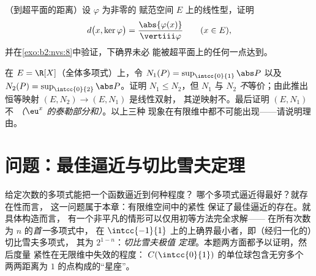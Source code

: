 \begin{exercise}[$\star\star$]\label{exo:b2:nvs:11}
（到超平面的距离）设 $\varphi$ 为非零的
赋范空间 $E$ 上的线性型，证明
\[
d\bigl(x, \ker\varphi\bigr) =
\frac{\abs{\varphi(x)}}{\vertiii\varphi}
\qquad (x \in E),
\]
并在\cref{exo:b2:nvs:8}中验证，下确界未必
能被超平面上的任何一点达到。
\end{exercise}

\begin{exercise}[$\star\star\star$]\label{exo:b2:nvs:12}
在 $E = \R[X]$（全体多项式）上，令 $N_1(P) =
\sup_{\intcc{0}{1}}\abs P$ 以及 $N_2(P) =
\sup_{\intcc{0}{2}}\abs P$。证明 $N_1 \leq N_2$，但
$N_1$ 与 $N_2$ \emph{不}等价；由此推出
恒等映射 $(E, N_2) \to (E, N_1)$ 是线性双射，
其逆映射不。最后证明 $(E, N_1)$
不 \emph{（$\eu^x$ 的泰勒部分和）}。以上三种
现象在有限维中都不可能出现——请说明理由。
\end{exercise}

\section{问题：最佳逼近与切比雪夫定理}

给定次数的多项式能把一个函数逼近到何种程度？
哪个多项式逼近得最好？就存在性而言，
这一问题属于本章：有限维空间中的紧性
保证了最佳逼近的存在。就具体构造而言，
有一个非平凡的情形可以仅用初等方法完全求解——
在所有次数为 $n$ 的\emph{首一}多项式中，
在 $\intcc{-1}{1}$ 上的上确界最小者，即（经归一化的）切比雪夫多项式，
其为 $2^{1-n}$：\emph{切比雪夫极值
定理}。本题两方面都予以证明，然后度量
紧性在无限维中失效的程度：
$C(\intcc{0}{1})$ 的单位球包含无穷多个
两两距离为 $1$ 的点构成的“星座”。

